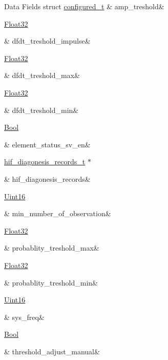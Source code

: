 \begin{DoxyFields}{Data Fields}
\hypertarget{a00021_a4b3bbfb0267daea1432f2603825ade62}{struct \hyperlink{a00021_db/ddc/a00353}{configured\+\_\+t}}\label{a00021_a4b3bbfb0267daea1432f2603825ade62}
&
amp\+\_\+treshold&
\\
\hline

\hypertarget{a00021_a3b9c683370c94430a4c6a9d78ce6f5ef}{\hyperlink{a00072_a87d38f886e617ced2698fc55afa07637}{Float32}}\label{a00021_a3b9c683370c94430a4c6a9d78ce6f5ef}
&
dfdt\+\_\+treshold\+\_\+impulse&
\\
\hline

\hypertarget{a00021_adf9a37828e447378b1d533185213316d}{\hyperlink{a00072_a87d38f886e617ced2698fc55afa07637}{Float32}}\label{a00021_adf9a37828e447378b1d533185213316d}
&
dfdt\+\_\+treshold\+\_\+max&
\\
\hline

\hypertarget{a00021_a6f5257920e763b7f5f440bc0515cd963}{\hyperlink{a00072_a87d38f886e617ced2698fc55afa07637}{Float32}}\label{a00021_a6f5257920e763b7f5f440bc0515cd963}
&
dfdt\+\_\+treshold\+\_\+min&
\\
\hline

\hypertarget{a00021_afeb3f74725269028a60926f98890c22b}{\hyperlink{a00072_a253b248072cfc8bd812c69acd0046eed}{Bool}}\label{a00021_afeb3f74725269028a60926f98890c22b}
&
element\+\_\+status\+\_\+sv\+\_\+en&
\\
\hline

\hypertarget{a00021_ae18294f7499d9fcb5ec796a1816b8cd8}{\hyperlink{a00022_a4726b814166e222a6f13e21453f76d8d}{hif\+\_\+diagonesis\+\_\+records\+\_\+t} $\ast$}\label{a00021_ae18294f7499d9fcb5ec796a1816b8cd8}
&
hif\+\_\+diagonesis\+\_\+records&
\\
\hline

\hypertarget{a00021_ae8665e8bf422c1482442d6949ba28408}{\hyperlink{a00072_a59a9f6be4562c327cbfb4f7e8e18f08b}{Uint16}}\label{a00021_ae8665e8bf422c1482442d6949ba28408}
&
min\+\_\+number\+\_\+of\+\_\+observation&
\\
\hline

\hypertarget{a00021_a7e2d217b9c9051d361319180a426851c}{\hyperlink{a00072_a87d38f886e617ced2698fc55afa07637}{Float32}}\label{a00021_a7e2d217b9c9051d361319180a426851c}
&
probablity\+\_\+treshold\+\_\+max&
\\
\hline

\hypertarget{a00021_aa59261f74183d4f9e909ac425e0bea35}{\hyperlink{a00072_a87d38f886e617ced2698fc55afa07637}{Float32}}\label{a00021_aa59261f74183d4f9e909ac425e0bea35}
&
probablity\+\_\+treshold\+\_\+min&
\\
\hline

\hypertarget{a00021_aa57be45aa1320405a885474010159c9e}{\hyperlink{a00072_a59a9f6be4562c327cbfb4f7e8e18f08b}{Uint16}}\label{a00021_aa57be45aa1320405a885474010159c9e}
&
sys\+\_\+freq&
\\
\hline

\hypertarget{a00021_a18e270a10094f045f20299b0f7e83085}{\hyperlink{a00072_a253b248072cfc8bd812c69acd0046eed}{Bool}}\label{a00021_a18e270a10094f045f20299b0f7e83085}
&
threshold\+\_\+adjust\+\_\+manual&
\\
\hline

\end{DoxyFields}
